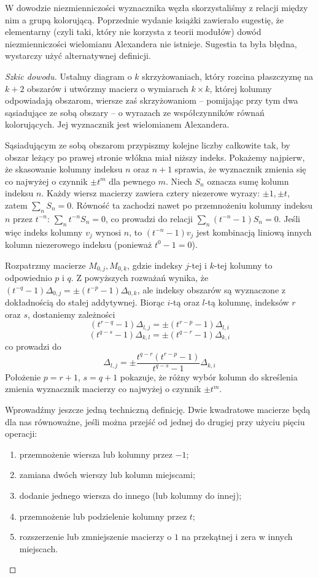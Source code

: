 W dowodzie niezmienniczości wyznacznika węzła skorzystaliśmy z relacji między nim a grupą kolorującą.
Poprzednie wydanie książki zawierało sugestię, że elementarny (czyli taki, który nie korzysta z teorii modułów) dowód niezmienniczości wielomianu Alexandera nie istnieje.
Sugestia ta była błędna, wystarczy użyć alternatywnej definicji.

\begin{proof}[Szkic dowodu]
	Ustalmy diagram o $k$ skrzyżowaniach, który rozcina płaszczyznę na $k+2$ obszarów i utwórzmy macierz o wymiarach $k \times k$, której kolumny odpowiadają obszarom, wiersze zaś skrzyżowaniom -- pomijając przy tym dwa sąsiadujące ze sobą obszary -- o wyrazach ze współczynników równań kolorujących.
	Jej wyznacznik jest wielomianem Alexandera.

	Sąsiadującym ze sobą obszarom przypiszmy kolejne liczby całkowite tak, by obszar leżący po prawej stronie włókna miał niższy indeks.
	Pokażemy najpierw, że skasowanie kolumny indeksu $n$ oraz $n+1$ sprawia, że wyznacznik zmienia się co najwyżej o czynnik $\pm t^m$ dla pewnego $m$.
	Niech $S_n$ oznacza sumę kolumn indeksu $n$.
	Każdy wiersz macierzy zawiera cztery niezerowe wyrazy: $\pm 1, \pm t$, zatem $\sum_n S_n = 0$.
	Równość ta zachodzi nawet po przemnożeniu kolumny indeksu $n$ przez $t^{-n}$: $\sum_n t^{-n}S_n = 0$, co prowadzi do relacji $\sum_n (t^{-n}-1) S_n = 0$.
	Jeśli więc indeks kolumny $v_j$ wynosi $n$, to $(t^{-n}-1)v_j$ jest kombinacją liniową innych kolumn niezerowego indeksu (ponieważ $t^0 - 1 = 0$).

	Rozpatrzmy macierze $M_{0,j}, M_{0,k}$, gdzie indeksy $j$-tej i $k$-tej kolumny to odpowiednio $p$ i $q$.
	Z powyższych rozważań wynika, że $(t^{-q}-1) \Delta_{0,j} = \pm (t^{-p}-1)\Delta_{0,k}$, ale indeksy obszarów są wyznaczone z dokładnością do stałej addytywnej.
	Biorąc $i$-tą oraz $l$-tą kolumnę, indeksów $r$ oraz $s$, dostaniemy zależności
	$$(t^{r-q}-1) \Delta_{l,j} = \pm (t^{r-p} - 1)\Delta_{l,i}$$
	$$(t^{q-s}-1) \Delta_{k,l} = \pm (t^{q-r} - 1)\Delta_{k,i}$$
	co prowadzi do
	$$\Delta_{l,j} = \pm \frac{t^{q-r}(t^{r-p}-1)}{t^{q-s}-1} \Delta_{k,i}$$
	Położenie $p = r +1$, $s =q+1$ pokazuje, że różny wybór kolumn do skreślenia zmienia wyznacznik macierzy co najwyżej o czynnik $\pm t^m$.

	Wprowadźmy jeszcze jedną techniczną definicję.
	Dwie kwadratowe macierze będą dla nas równoważne, jeśli można przejść od jednej do drugiej przy użyciu pięciu operacji:
	\begin{enumerate}[leftmargin=*]
	\itemsep0em
		\item przemnożenie wiersza lub kolumny przez $-1$;
		\item zamiana dwóch wierszy lub kolumn miejscami;
		\item dodanie jednego wiersza do innego (lub kolumny do innej);
		\item przemnożenie lub podzielenie kolumny przez $t$;
		\item rozszerzenie lub zmniejszenie macierzy o $1$ na przekątnej i zera w innych miejscach.
	\end{enumerate}


\end{proof}
